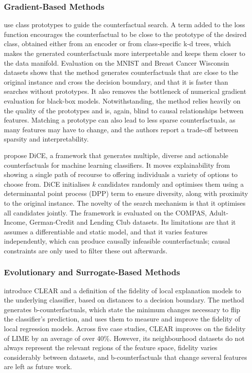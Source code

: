 \subsubsection{Gradient-Based Methods}
\label{subsec:lr-gradient-search}
\citet{vanlooveren2020interpretable} use class prototypes to guide the counterfactual search. A term
added to the loss function encourages the counterfactual to be close to the prototype of the desired
class, obtained either from an encoder or from class-specific k-d trees, which makes the generated
counterfactuals more interpretable and keeps them closer to the data manifold. Evaluation on the MNIST
and Breast Cancer Wisconsin datasets shows that the method generates counterfactuals that are close to
the original instance and cross the decision boundary, and that it is faster than searches without
prototypes. It also removes the bottleneck of numerical gradient evaluation for black-box models.
Notwithstanding, the method relies heavily on the quality of the prototypes and is, again, blind to
causal relationships between features. Matching a prototype can also lead to less sparse
counterfactuals, as many features may have to change, and the authors report a trade-off between
sparsity and interpretability.

\citet{mothilal2020explaining} propose DiCE, a framework that generates multiple, diverse and actionable
counterfactuals for machine learning classifiers. It moves explainability from showing a single path of
recourse to offering individuals a variety of options to choose from. DiCE initialises $k$ candidates
randomly and optimises them using a determinantal point process (DPP) term to ensure diversity, along
with proximity to the original instance. The novelty of the search mechanism is that it optimises all
candidates jointly. The framework is evaluated on the COMPAS, Adult-Income, German-Credit and Lending
Club datasets. Its limitations are that it assumes a differentiable and static model, and that it varies
features independently, which can produce causally infeasible counterfactuals; causal constraints are
only used to filter these out afterwards.

\subsubsection{Evolutionary and Surrogate-Based Methods}
\label{subsec:lr-heuristic-search}
\citet{white2019measurable} introduce CLEAR and a definition of the fidelity of local explanation models
to the underlying classifier, based on distances to a decision boundary. The method generates
b-counterfactuals, which state the minimum changes necessary to flip the classifier's prediction, and
uses them to measure and improve the fidelity of local regression models. Across five case studies,
CLEAR improves on the fidelity of LIME by an average of over 40\%. However, its neighbourhood datasets
do not always represent the relevant regions of the feature space, fidelity varies considerably between
datasets, and b-counterfactuals that change several features are left as future work.

